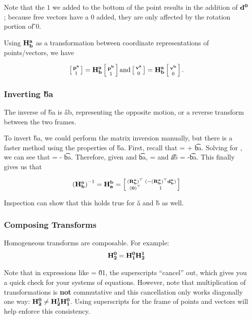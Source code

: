 \documentclass{16384_doc}
\begin{document}
Note that the $1$ we added to the bottom of the point results in the addition of
$\mathbf{d_{}^{0}}$; because free vectors have a $0$ added, they are only affected by the
rotation portion of \H{}{0}.

Using $\mathbf{H_{b}^{a}}$ as a transformation between coordinate representations of
points/vectors, we have

$$
\left[\begin{smallmatrix}\mathbf{p_{}^{a}}\\1\end{smallmatrix}\right] = \mathbf{H_{b}^{a}} \left[\begin{smallmatrix}\mathbf{p_{}^{b}}\\1\end{smallmatrix}\right] \text{and} \left[\begin{smallmatrix}\mathbf{v_{}^{a}}\\0\end{smallmatrix}\right] = \mathbf{H_{b}^{a}} \left[\begin{smallmatrix}\mathbf{v_{}^{b}}\\0\end{smallmatrix}\right].
$$

\subsubsection{Inverting \H{b}{a}}
The inverse of \H{b}{a} is \H{a}{b}, representing the opposite motion, or a
reverse transform between the two frames.

To invert \H{b}{a}, we could perform the matrix inversion manually,
but there is a faster method using the properties of \H{b}{a}. First,
recall that  =   + \t{b}{a}.  Solving for , we can see
that  =  - \t{b}{a}.  Therefore, given
 and \t{b}{a},  =  and \t{a}{b} =
-\t{b}{a}.  This finally gives us that

$$
\left(\mathbf{H_{b}^{a}}\right)^{-1} = \mathbf{H_{a}^{b}} = \left[\begin{smallmatrix}\left(\mathbf{R_{b}^{a}}\right)^{\top}&(-\left(\mathbf{R_{b}^{a}}\right)^{\top}\mathbf{d_{b}^{a}})\\\left(\mathbf{0}\right)^{\top}&1\end{smallmatrix}\right]
$$

Inspection can show that this holds true for \v{a} and \v{b} as well.

\subsubsection{Composing Transforms}

Homogeneous transforms are composable. For example:
$$
\mathbf{H_{2}^{0}} = \mathbf{H_{1}^{0}} \mathbf{H_{2}^{1}}
$$

Note that in expressions like  = \H{0}{1}, the superscripts ``cancel''
out, which gives you a quick check for your systems of equations.  However, note
that multiplication of transformations is \textbf{not} commutative and this
cancellation only works diagonally one way: $\mathbf{H_{2}^{0}} \ne \mathbf{H_{2}^{1}} \mathbf{H_{1}^{0}}$.
Using superscripts for the frame of points and vectors will help enforce this
consistency.
\end{document}
